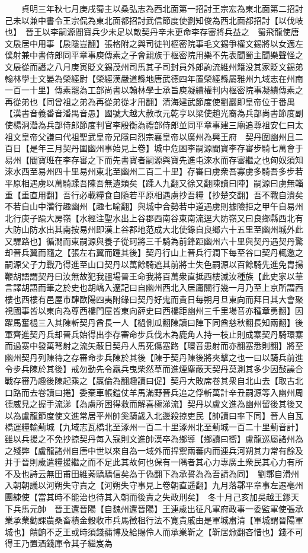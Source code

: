 　　貞明三年秋七月庚戌蜀主以桑弘志為西北面第一招討王宗宏為東北面第二招討己未以兼中書令王宗侃為東北面都招討武信節度使劉知俊為西北面都招討【以伐岐也】　晉王以李嗣源閻寶兵少未足以敵契丹辛未更命李存審將兵益之　蜀飛龍使唐文扆居中用事【扆隱豈翻】張格附之與司徒判樞密院事毛文錫爭權文錫將以女適左僕射兼中書侍郎同平章事庾傳素之子會親族于樞密院用樂不先表聞蜀主聞樂聲怪之文扆從而譖之八月庚寅貶文錫茂州司馬其子司封員外郎詢流維州籍没其家貶文錫弟翰林學士文晏為榮經尉【榮經漢嚴道縣地唐武德四年置榮經縣屬雅州九域志在州南一百一十里】傳素罷為工部尚書以翰林學士承旨庾凝績權判内樞密院事凝績傳素之再從弟也【同曾祖之弟為再從弟從才用翻】清海建武節度使劉巖即皇帝位于番禺【漢書音義番音潘禺音愚】國號大越大赦改元乾亨以梁使趙光裔為兵部尚書節度副使楊洞濳為兵部侍郎節度判官李殷衡為禮部侍郎並同平章事建三廟追尊祖安仁曰太祖文皇帝父謙曰代祖聖武皇帝兄隱曰烈宗襄皇帝以廣州為興王府　契丹圍幽州且二百日【是年三月契丹圍幽州事始見上卷】城中危困李嗣源閻寶李存審步騎七萬會于易州【閻寶班在李存審之下而先書寶者嗣源與寶先進屯淶水而存審繼之也匈奴須知淶水西至易州四十里易州東北至幽州二百二十里】存審曰虜衆吾寡虜多騎吾多步若平原相遇虜以萬騎蹂吾陳吾無遺類矣【蹂人九翻又徐又翻陳讀曰陣】嗣源曰虜無輜重【重直用翻】吾行必載糧食自隨若平原相遇虜抄吾糧【抄楚交翻】吾不戰自潰矣不若自山中濳行趣幽州【趣七喻翻】與城中合勢若中道遇虜則據險拒之甲午自易州北行庚子踰大房嶺【水經注聖水出上谷郡西南谷東南流逕大防嶺又曰良鄉縣西北有大防山防水出其南按易州即漢上谷郡地范成大北使錄自良鄉六十五里至幽州城外此又驛路也】循澗而東嗣源與養子從珂將三千騎為前鋒距幽州六十里與契丹遇契丹驚却晉兵翼而隨之【張左右翼而踵其後】契丹行山上晉兵行澗下每至谷口契丹輒邀之嗣源父子力戰乃得進至山口契丹以萬餘騎遮其前將士失色嗣源以百餘騎先進免胄揚鞭胡語謂契丹曰汝無故犯我疆場晉王命我將百萬衆直抵西樓滅汝種族【此史家以華言譯胡語而筆之於史也胡嶠入遼記曰自幽州西北入居庸關行幾一月乃至上京所謂西樓也西樓有邑屋市肆歐陽四夷附錄曰契丹好鬼而貴日每朔月旦東向而拜日其大會聚視國事皆以東向為尊西樓門屋皆東向薛史曰西樓距幽州三千里場音亦種章勇翻】因躍馬奮檛三入其陳斬契丹酋長一人【檛側瓜翻陳讀曰陣下同酋慈秋翻長知兩翻】後軍齊進契丹兵却晉兵始得出李存審命步兵伐木為鹿角人持一枝止則成寨契丹騎環寨而過寨中發萬弩射之流矢蔽日契丹人馬死傷塞路【環音患射而亦翻塞悉則翻】將至幽州契丹列陳待之存審命步兵陳於其後【陳于契丹陳後將夾擊之也一曰以騎兵前進令步兵陳於其後】戒勿動先令羸兵曳柴然草而進煙塵蔽天契丹莫測其多少因鼔譟合戰存審乃趣後陳起乘之【羸倫為翻趣讀曰促】契丹大敗席卷其衆自北山去【取古北口路而去卷讀曰捲】委棄車帳鎧仗羊馬滿野晉兵追之俘斬萬計辛丑嗣源等入幽州周德威見之握手流涕【為虜所困得救而解喜極涕流】契丹以盧文進為幽州留後其後又以為盧龍節度使文進常居平州帥奚騎歲入北邊殺掠吏民【帥讀曰率下同】晉人自瓦橋運糧輸薊城【九域志瓦橋北至涿州一百二十里涿州北至薊城一百二十里薊音計】雖以兵援之不免抄掠契丹每入寇則文進帥漢卒為鄉導【鄉讀曰嚮】盧龍巡屬諸州為之殘弊【盧龍諸州自唐中世以來自為一域外而捍禦兩蕃内而連兵河朔其力常有餘及并于晉則歲遣糧援繼之而不足此其故何也保有一隅者其心力專廣土衆民其心力有所不及也詩云無田甫田維莠驕驕信矣為于偽翻下為承誓為為吾請為同】　劉鄩自滑州入朝朝議以河朔失守責之【河朔失守事見上卷朝直遥翻】九月落鄩平章事左遷亳州團練使【當其時不能治也待其入朝而後責之失政刑矣】　冬十月己亥加吳越王鏐天下兵馬元帥　晉王還晉陽【自魏州還晉陽】王連歲出征凡軍府政事一委監軍使張承業承業勸課農桑畜積金穀收市兵馬徵租行法不寛貴戚由是軍城肅清【軍城謂晉陽軍城也】饋餉不乏王或時須錢蒱博及給賜伶人而承業靳之【靳居焮翻吝惜也】錢不可得王乃置酒錢庫令其子繼岌為